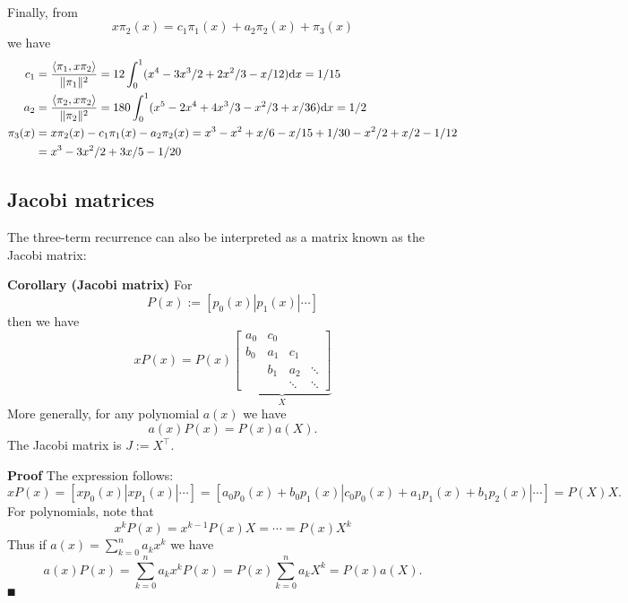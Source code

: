\begin{corollary}
\begin{example}
\begin{align*}
\end{align*}
Finally, from
\[
x \ensuremath{\pi}_2(x) = c_1 \ensuremath{\pi}_1(x) + a_2 \ensuremath{\pi}_2(x) +  \ensuremath{\pi}_3(x)
\]
we have
\begin{align*}
c_1 &= {\ensuremath{\langle}\ensuremath{\pi}_1,x \ensuremath{\pi}_2\ensuremath{\rangle}  \over \|\ensuremath{\pi}_1\|^2} = 12 \ensuremath{\int}_0^1 (x^4 - 3x^3/2 +2x^2/3 -x/12)  {\rm d} x = 1/15 \\
a_2 &= {\ensuremath{\langle}\ensuremath{\pi}_2,x \ensuremath{\pi}_2\ensuremath{\rangle}  \over \|\ensuremath{\pi}_2\|^2} = 180 \ensuremath{\int}_0^1 (x^5 - 2x^4 +4x^3/3 - x^2/3 + x/36) {\rm d} x = 1/2 \\
\ensuremath{\pi}_3(x) &= x \ensuremath{\pi}_2(x) - c_1 \ensuremath{\pi}_1(x)- a_2 \ensuremath{\pi}_2(x) = x^3 - x^2 + x/6 - x/15 + 1/30 -x^2/2 + x/2 - 1/12 \\
&= x^3 - 3x^2/2 + 3x/5 -1/20
\end{align*}
\end{example}

\subsection{Jacobi matrices}
The three-term recurrence can also be interpreted as a matrix known as the Jacobi matrix:

\textbf{Corollary (Jacobi matrix)} For
\[
P(x) := [p_0(x) | p_1(x) | \ensuremath{\cdots}]
\]
then we have
\[
x P(x) = P(x) \underbrace{\begin{bmatrix} a_0 & c_0 \\
                                                        b_0 & a_1 & c_1\\
                                                        & b_1 & a_2 & \ensuremath{\ddots} \\
                                                        && \ensuremath{\ddots} & \ensuremath{\ddots}
                                                        \end{bmatrix}}_X
\]
More generally, for any polynomial $a(x)$ we have
\[
a(x) P(x) = P(x) a(X).
\]
The Jacobi matrix is $J := X^\ensuremath{\top}$.

\end{corollary}
\textbf{Proof} The expression follows:
\[
x P(x) = [xp_0(x) | xp_1(x) | \ensuremath{\cdots}] =
[a_0p_0(x) + b_0 p_1(x) | c_0 p_0(x) + a_1 p_1(x) + b_1 p_2(x) | \ensuremath{\cdots}] = P(X) X.
\]
For polynomials, note that
\[
x^k P(x) = x^{k-1} P(x) X = \ensuremath{\cdots} = P(x) X^k
\]
Thus if $a(x) = \ensuremath{\sum}_{k=0}^n a_k x^k$ we have
\[
a(x) P(x) = \ensuremath{\sum}_{k=0}^n a_k x^k P(x) = P(x) \ensuremath{\sum}_{k=0}^n a_k X^k = P(x) a(X).
\]
\ensuremath{\QED}

